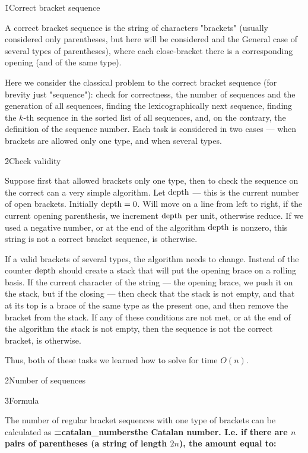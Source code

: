 \h1{Correct bracket sequence}

A correct bracket sequence is the string of characters "brackets" (usually considered only parentheses, but here will be considered and the General case of several types of parentheses), where each close-bracket there is a corresponding opening (and of the same type).

Here we consider the classical problem to the correct bracket sequence (for brevity just "sequence"): check for correctness, the number of sequences and the generation of all sequences, finding the lexicographically next sequence, finding the $k$-th sequence in the sorted list of all sequences, and, on the contrary, the definition of the sequence number. Each task is considered in two cases --- when brackets are allowed only one type, and when several types.


\h2{Check validity}

Suppose first that allowed brackets only one type, then to check the sequence on the correct can a very simple algorithm. Let $\rm depth$ --- this is the current number of open brackets. Initially $\rm depth = 0$. Will move on a line from left to right, if the current opening parenthesis, we increment $\rm depth$ per unit, otherwise reduce. If we used a negative number, or at the end of the algorithm $\rm depth$ is nonzero, this string is not a correct bracket sequence, is otherwise.

If a valid brackets of several types, the algorithm needs to change. Instead of the counter $\rm depth$ should create a stack that will put the opening brace on a rolling basis. If the current character of the string --- the opening brace, we push it on the stack, but if the closing --- then check that the stack is not empty, and that at its top is a brace of the same type as the present one, and then remove the bracket from the stack. If any of these conditions are not met, or at the end of the algorithm the stack is not empty, then the sequence is not the correct bracket, is otherwise.

Thus, both of these tasks we learned how to solve for time $O(n)$.


\h2{Number of sequences}

\h3{Formula}

The number of regular bracket sequences with one type of brackets can be calculated as \bf{\algohref=catalan_numbers{the Catalan number}}. I.e. if there are $n$ pairs of parentheses (a string of length $2n$), the amount equal to:


